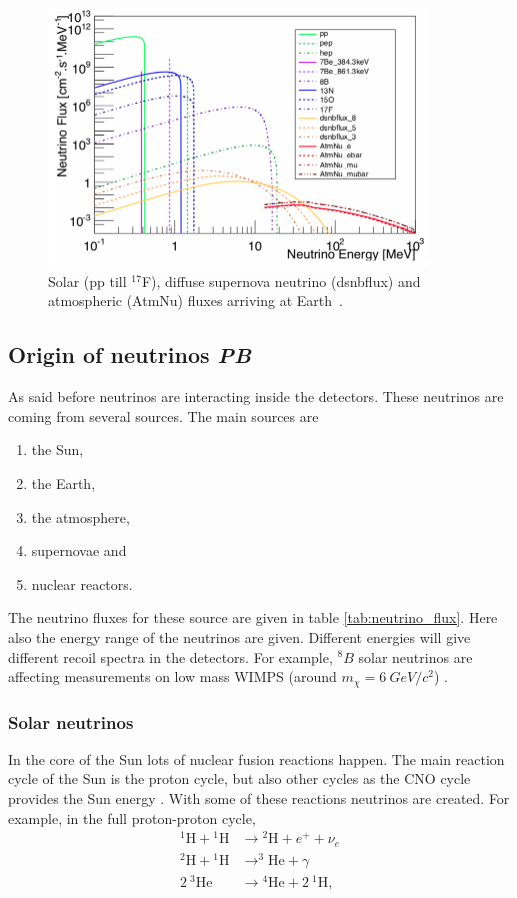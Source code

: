 \documentclass{article}
\begin{document}
\begin{figure}[h!]
    \centering
    \includegraphics[width = 0.9\textwidth]{Plot_neutrino_flux.png}
    \caption{Solar (pp till ${}^{17}$F), diffuse supernova neutrino (dsnbflux) and atmospheric (AtmNu) fluxes arriving at Earth~\cite{Billard:2013qya}.}
    \label{fig:neutrino_flux}
\end{figure}


\subsection{Origin of neutrinos \small{\textit{PB}}}
As said before neutrinos are interacting inside the detectors. These neutrinos are coming from several sources. The main sources are
\begin{enumerate}
    \item the Sun,
    \item the Earth,
    \item the atmosphere,
    \item supernovae and
    \item nuclear reactors.
\end{enumerate}
The neutrino fluxes for these source are given in table \ref{tab:neutrino_flux}. Here also the energy range of the neutrinos are given. Different energies will give different recoil spectra in the detectors. For example, ${}^8B$ solar neutrinos are affecting measurements on low mass WIMPS (around $m_\chi=6\ GeV/c^2$) \cite{Billard:2013qya}.

\subsubsection{Solar neutrinos}
In the core of the Sun lots of nuclear fusion reactions happen. The main reaction cycle of the Sun is the proton cycle, but also other cycles as the CNO cycle provides the Sun energy \cite{Bonventre:2018hyd}. With some of these reactions neutrinos are created. For example, in the full proton-proton cycle,
\begin{align}
    {}^1\text{H}+{}^1\text{H}&\rightarrow {}^2\text{H}+e^++\nu_e \nonumber\\
    {}^2\text{H} + {}^1\text{H} &\rightarrow ^3\text{He}+\gamma \nonumber\\
    2\ {}^3\text{He} &\rightarrow {}^4\text{He}+2\ {}^1\text{H},
\end{align}
\end{document}
